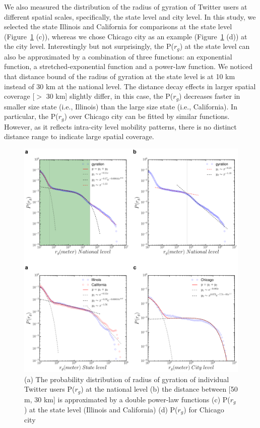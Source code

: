 \documentclass[ijgi,article,submit,moreauthors,pdftex,10pt,a4paper]{mdpi}
\theoremstyle{mdpi}
\newcounter{ex}
\newcounter{re}
\theoremstyle{mdpidefinition}
\begin{document}
We also measured the distribution of the radius of gyration of Twitter users at different spatial scales, specifically, the state level and city level.
In this study, we selected the state Illinois and California for comparisons at the state level (Figure~\ref{fig:gyration} (c)), whereas we chose Chicago city as an example (Figure~\ref{fig:gyration} (d)) at the city level.
Interestingly but not surprisingly, the P($r_{g}$) at the state level can also be approximated by a combination of three functions: an exponential function, a stretched-exponential function and a power-law function.
We noticed that distance bound of the radius of gyration at the state level is at 10 km instead of 30 km at the national level.
The distance decay effects in larger spatial coverage [$>$ 30 km] slightly differ, in this case, the P($r_{g}$) decreases faster in smaller size state (i.e., Illinois) than the large size state (i.e., California).
In particular, the P($r_{g}$) over Chicago city can be fitted by similar functions.
However, as it reflects intra-city level mobility patterns, there is no distinct distance range to indicate large spatial coverage.

\begin{figure}[ht]
\centering
\includegraphics[width=1.0\linewidth]{./figures/gyration2}
\caption{ (a) The probability distribution of radius of gyration of individual Twitter users P($r_{g}$) at the national level (b) the distance between [50 m, 30 km] is approximated by a double power-law functions (c) P($r_{g}$) at the state level (Illinois and California) (d) P($r_{g}$) for Chicago city} 
\label{fig:gyration}
\end{figure}
\FloatBarrier
\end{document}
